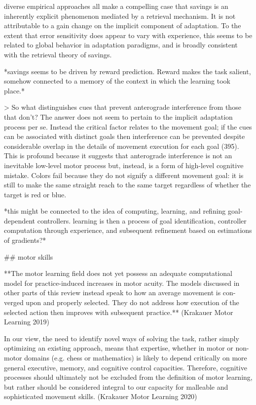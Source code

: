 \documentclass[../main.tex]{subfiles}
\begin{document}
{{diverse empirical approaches all make a compelling case that savings is an inherently explicit phenomenon mediated by a retrieval mechanism. It is not attributable to a gain change on the implicit component of adaptation. To the extent that error sensitivity does appear to vary with experience, this seems to be related to global behavior in adaptation paradigms, and is broadly consistent with the retrieval theory of savings.

*savings seems to be driven by reward prediction. Reward makes the task salient, somehow connected to a memory of the context in which the learning took place.*

> So what distinguishes cues that prevent anterograde interference from those that don’t? The answer does not seem to pertain to the implicit adaptation process per se. Instead the critical factor relates to the movement goal; if the cues can be associated with distinct goals then interference can be prevented despite considerable overlap in the details of movement execution for each goal (395). This is profound because it suggests that anterograde interference is not an inevitable low-level motor process but, instead, is a form of high-level cognitive mistake. Colors fail because they do not signify a different movement goal: it is still to make the same straight reach to the same target regardless of whether the target is red or blue.

*this might be connected to the idea of computing, learning, and refining goal-dependent controllers. learning is then a process of goal identification, controller computation through experience, and subsequent refinement based on estimations of gradients?*

## motor skills

**The motor learning field does not yet possess an adequate computational model for practice-induced increases in motor acuity. The models discussed in other parts of this review instead speak to how an average movement is con- verged upon and properly selected. They do not address how execution of the selected action then improves with subsequent practice.** (Krakauer Motor Learning 2019)

In our view, the need to identify novel ways of solving the task, rather simply optimizing an existing approach, means that expertise, whether in motor or non-motor domains (e.g. chess or mathematics) is likely to depend critically on more general executive, memory, and cognitive control capacities. Therefore, cognitive processes should ultimately not be excluded from the definition of motor learning, but rather should be considered integral to our capacity for malleable and sophisticated movement skills. (Krakauer Motor Learning 2020)

}}
\end{document}
